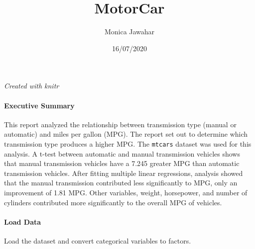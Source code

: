 \documentclass[
]{article}
\title{MotorCar}
\author{Monica Jawahar}
\date{16/07/2020}
\newenvironment{Shaded}{\begin{snugshade}}{\end{snugshade}}
\newcommand{\DataTypeTok}[1]{\textcolor[rgb]{0.13,0.29,0.53}{#1}}
\newcommand{\DecValTok}[1]{\textcolor[rgb]{0.00,0.00,0.81}{#1}}
\newcommand{\KeywordTok}[1]{\textcolor[rgb]{0.13,0.29,0.53}{\textbf{#1}}}
\newcommand{\NormalTok}[1]{#1}
\newcommand{\OperatorTok}[1]{\textcolor[rgb]{0.81,0.36,0.00}{\textbf{#1}}}
\newcommand{\StringTok}[1]{\textcolor[rgb]{0.31,0.60,0.02}{#1}}
\begin{document}
\maketitle

\emph{Created with knitr}

\hypertarget{executive-summary}{%
\paragraph{Executive Summary}\label{executive-summary}}

This report analyzed the relationship between transmission type (manual
or automatic) and miles per gallon (MPG). The report set out to
determine which transmission type produces a higher MPG. The
\texttt{mtcars} dataset was used for this analysis. A t-test between
automatic and manual transmission vehicles shows that manual
transmission vehicles have a 7.245 greater MPG than automatic
transmission vehicles. After fitting multiple linear regressions,
analysis showed that the manual transmission contributed less
significantly to MPG, only an improvement of 1.81 MPG. Other variables,
weight, horsepower, and number of cylinders contributed more
significantly to the overall MPG of vehicles.

\hypertarget{load-data}{%
\paragraph{Load Data}\label{load-data}}

Load the dataset and convert categorical variables to factors.

\begin{Shaded}
\end{Shaded}
\end{document}
